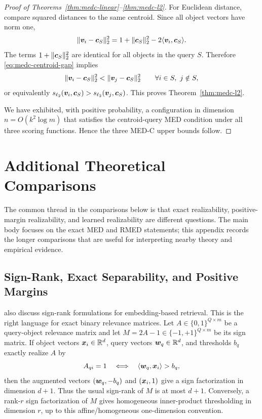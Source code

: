 \documentclass{article}
\begin{document}
\begin{proof}[Proof of Theorems~\ref{thm:medc-linear}--\ref{thm:medc-l2}]
For Euclidean distance, compare squared distances to the same centroid. Since all object vectors have norm one,
\[
    \|\bm{v}_i-\bm{c}_S\|_2^2
    =
    1+\|\bm{c}_S\|_2^2-2\langle \bm{v}_i,\bm{c}_S\rangle .
\]
The terms $1+\|\bm{c}_S\|_2^2$ are identical for all objects in the query $S$. Therefore \eqref{eq:medc-centroid-gap} implies
\[
    \|\bm{v}_i-\bm{c}_S\|_2^2
    <
    \|\bm{v}_j-\bm{c}_S\|_2^2
    \qquad
    \forall i\in S,\ j\notin S,
\]
or equivalently $s_{\ell_2}(\bm{v}_i,\bm{c}_S)>s_{\ell_2}(\bm{v}_j,\bm{c}_S)$. This proves Theorem~\ref{thm:medc-l2}.

We have exhibited, with positive probability, a configuration in dimension $n=O(k^2\log m)$ that satisfies the centroid-query MED condition under all three scoring functions. Hence the three MED-C upper bounds follow.
\end{proof}
\section{Additional Theoretical Comparisons}\label{app:additional-comparisons}

The common thread in the comparisons below is that exact realizability, positive-margin realizability, and learned realizability are different questions. The main body focuses on the exact MED and RMED statements; this appendix records the longer comparisons that are useful for interpreting nearby theory and empirical evidence.

\subsection{Sign-Rank, Exact Separability, and Positive Margins}

\citet{weller2025theoretical} also discuss sign-rank formulations for embedding-based retrieval. This is the right language for exact binary relevance matrices. Let $A\in\{0,1\}^{Q\times m}$ be a query-object relevance matrix and let $M=2A-1\in\{-1,+1\}^{Q\times m}$ be its sign matrix. If object vectors $\bm{x}_i\in\mathbb{R}^d$, query vectors $\bm{w}_q\in\mathbb{R}^d$, and thresholds $b_q$ exactly realize $A$ by
\[
    A_{q i}=1
    \quad\Longleftrightarrow\quad
    \langle \bm{w}_q,\bm{x}_i\rangle>b_q,
\]
then the augmented vectors $(\bm{w}_q,-b_q)$ and $(\bm{x}_i,1)$ give a sign factorization in dimension $d+1$. Thus the usual sign-rank of $M$ is at most $d+1$. Conversely, a rank-$r$ sign factorization of $M$ gives homogeneous inner-product thresholding in dimension $r$, up to this affine/homogeneous one-dimension convention.
\end{document}
